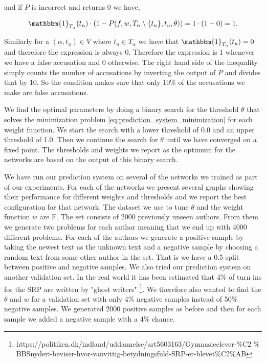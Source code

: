 and if $P$ is incorrect and returns 0 we have,

\begin{equation}
    \mathbbm{1}_{T_\alpha}(t_u) \cdot
    \left(1 - P(f, w, T_\alpha \setminus \{t_u\}, t_u, \theta)\right) =
    1 \cdot (1 - 0) = 1.
\end{equation}

Similarly for a $(\alpha, t_u) \in V$ where $t_u \in T_\alpha$ we have that
$\mathbbm{1}_{T_\alpha}(t_u) = 0$ and therefore the expression is always
0. Therefore the expression is 1 whenever we have a false accusation and 0
otherwise. The right hand side of the inequality simply counts the number of
accusations by inverting the output of $P$ and divides that by 10. So the
condition makes sure that only 10\% of the accusations we make are false
accusations.

We find the optimal parameters by doing a binary search for
the threshold $\theta$ that solves the minimization problem
\eqref{eq:prediction_system_minimization} for each weight function. We start
the search with a lower threshold of 0.0 and an upper threshold of 1.0. Then we
continue the search for $\theta$ until we have converged on a fixed point. The
thresholds and weights we report as the optimum for the networks are based on
the output of this binary search.

We have run our prediction system on several of the networks we trained as
part of our experiments. For each of the networks we present several graphs
showing their performance for different weights and thresholds and we report
the best configuration for that network. The dataset we use to tune $\theta$
and the weight function $w$ are F. The set consists of 2000 previously unseen
authors. From them we generate two problems for each author meaning that we
end up with 4000 different problems. For each of the authors we generate a
positive sample by taking the newest text as the unknown text and a negative
sample by choosing a random text from some other author in the set. That is
we have a 0.5 split between positive and negative samples. We also tried our
prediction system on another validation set. In the real world it has been
estimated that 4\% of turn ins for the \gls{SRP} are written by "ghost writers"
\footnote{https://politiken.dk/indland/uddannelse/art5603163/Gymnasieelever-\%C2
\% BBSnyderi-beviser-hvor-vanvittig-betydningsfuld-SRP-er-blevet\%C2\%AB}. We
therefore also wanted to find the $\theta$ and $w$ for a validation set with
only 4\% negative samples instead of 50\% negative samples. We generated 2000
positive samples as before and then for each sample we added a negative sample
with a 4\% chance.


